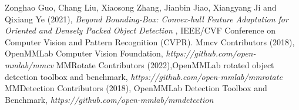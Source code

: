 \documentclass[12pt,a4paper,openany,oneside]{report}
\begin{document}
\begin{thebibliography}{30}


	 Zonghao Guo, Chang Liu, Xiaosong Zhang, Jianbin Jiao, Xiangyang Ji and Qixiang Ye (2021), \textit{Beyond Bounding-Box: Convex-hull Feature Adaptation for Oriented and Densely Packed Object Detection} , IEEE/CVF Conference on Computer Vision and Pattern Recognition (CVPR).
	 Mmcv Contributors (2018), OpenMMLab Computer Vision Foundation, \textit{https://github.com/open-mmlab/mmcv}
	 MMRotate Contributors (2022),OpenMMLab rotated object detection toolbox and benchmark, \textit{https://github.com/open-mmlab/mmrotate}
	 MMDetection Contributors (2018), OpenMMLab Detection Toolbox and Benchmark, \textit{https://github.com/open-mmlab/mmdetection}
\end{thebibliography} 
\end{document}

